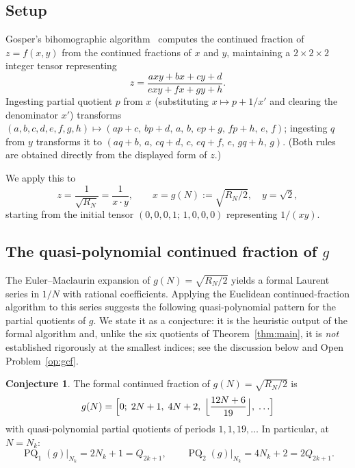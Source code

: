 \documentclass[12pt]{amsart}
\theoremstyle{definition}
\newtheorem{conjecture}[theorem]{Conjecture}
\DeclareMathOperator{\PQ}{PQ}
\begin{document}
\subsection{Setup}

Gosper's bihomographic algorithm~\cite{Gosper1972} computes the
continued fraction of $z = f(x,y)$ from the continued fractions of
$x$ and $y$, maintaining a $2\times2\times2$ integer tensor representing
\[
  z = \frac{axy+bx+cy+d}{exy+fx+gy+h}.
\]
Ingesting partial quotient $p$ from $x$ (substituting $x \mapsto p+1/x'$
and clearing the denominator $x'$) transforms
$(a,b,c,d,e,f,g,h) \mapsto (ap+c,\,bp+d,\,a,\,b,\,ep+g,\,fp+h,\,e,\,f)$;
ingesting $q$ from $y$ transforms it to
$(aq+b,\,a,\,cq+d,\,c,\,eq+f,\,e,\,gq+h,\,g)$.  (Both rules are obtained
directly from the displayed form of $z$.)

We apply this to
\[
  z = \frac{1}{\sqrt{R_N}} = \frac{1}{x \cdot y},
  \qquad
  x = g(N) := \sqrt{R_N/2}, \quad y = \sqrt{2},
\]
starting from the initial tensor $(0,0,0,1;\,1,0,0,0)$ representing $1/(xy)$.

\subsection{The quasi-polynomial continued fraction of $g$}

The Euler--Maclaurin expansion of $g(N) = \sqrt{R_N/2}$ yields a
formal Laurent series in $1/N$ with rational coefficients.  Applying
the Euclidean continued-fraction algorithm to this series suggests the
following quasi-polynomial pattern for the partial quotients of $g$.
We state it as a conjecture: it is the heuristic output of the formal
algorithm and, unlike the six quotients of Theorem~\ref{thm:main}, it is
\emph{not} established rigorously at the smallest indices; see the
discussion below and Open Problem~\ref{op:gcf}.

\begin{conjecture}\label{prop:gcf}
  The formal continued fraction of $g(N) = \sqrt{R_N/2}$ is
  \begin{equation}\label{eq:gcf}
    g(N) = \Bigl[0;\; 2N+1,\; 4N+2,\;
            \Bigl\lfloor\frac{12N+6}{19}\Bigr\rfloor,\; \ldots\Bigr]
  \end{equation}
  with quasi-polynomial partial quotients of periods $1, 1, 19, \ldots$
  In particular, at $N = N_k$:
  \begin{equation}\label{eq:gcf-pell}
    \PQ_1(g)\big|_{N_k} = 2N_k+1 = Q_{2k+1}, \qquad
    \PQ_2(g)\big|_{N_k} = 4N_k+2 = 2Q_{2k+1}.
  \end{equation}
\end{conjecture}
\end{document}
